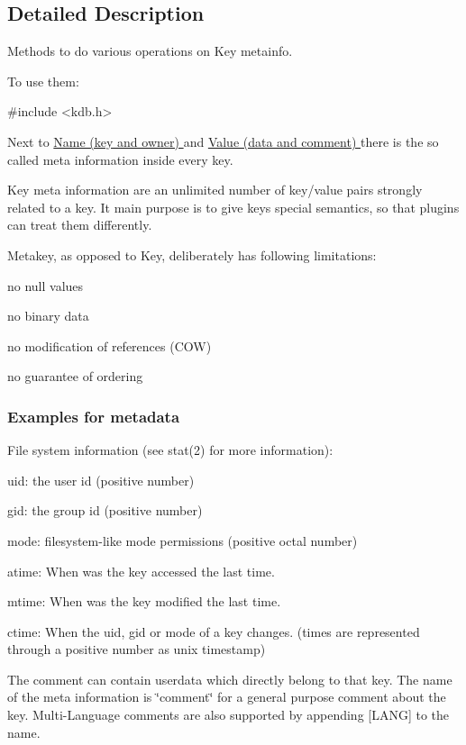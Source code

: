 \subsection{Detailed Description}
Methods to do various operations on Key metainfo. 

To use them\+: 
\begin{DoxyCode}
\textcolor{preprocessor}{#include <kdb.h>}
\end{DoxyCode}


Next to \hyperlink{group__keyname}{Name (key and owner) } and \hyperlink{group__keyvalue}{Value (data and comment) } there is the so called meta information inside every key.

Key meta information are an unlimited number of key/value pairs strongly related to a key. It main purpose is to give keys special semantics, so that plugins can treat them differently.

Metakey, as opposed to Key, deliberately has following limitations\+:
\begin{DoxyItemize}
\item no null values
\item no binary data
\item no modification of references (C\+O\+W)
\item no guarantee of ordering
\end{DoxyItemize}

\subsubsection*{Examples for metadata}

File system information (see stat(2) for more information)\+:
\begin{DoxyItemize}
\item uid\+: the user id (positive number)
\item gid\+: the group id (positive number)
\item mode\+: filesystem-\/like mode permissions (positive octal number)
\item atime\+: When was the key accessed the last time.
\item mtime\+: When was the key modified the last time.
\item ctime\+: When the uid, gid or mode of a key changes. (times are represented through a positive number as unix timestamp)
\end{DoxyItemize}

The comment can contain userdata which directly belong to that key. The name of the meta information is \char`\"{}comment\char`\"{} for a general purpose comment about the key. Multi-\/\+Language comments are also supported by appending \mbox{[}L\+A\+N\+G\mbox{]} to the name.

